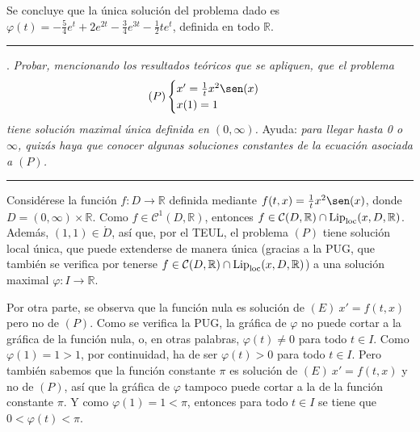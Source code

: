 \documentclass[11pt]{report}
\newcommand{\R}{\mathbb R}
\begin{document}
Se concluye que la única solución del problema dado es $\varphi(t)=-\frac{5}{4}e^t+2e^{2t}-\frac{3}{4}e^{3t}-\frac{1}{2}te^t$, definida en todo $\R$.

\vspace{4mm}

\hrule

\vspace{4mm}

. \textit{Probar, mencionando los resultados teóricos que se apliquen, que el problema}
\[(P) \begin{cases}
    x'=\frac{1}{t}x^2\sen(x) \\
    x(1)=1
\end{cases}\]
\textit{tiene solución maximal única definida en $(0,\infty)$.} Ayuda: \textit{para llegar hasta 0 o $\infty$, quizás haya que conocer algunas soluciones constantes de la ecuación asociada a $(P)$.}

\vspace{4mm}

\hrule

\vspace{4mm}

Considérese la función $f \colon D \to \R$ definida mediante $f(t,x)=\frac{1}{t}x^2\sen(x)$, donde $D=(0,\infty) \times \R$. Como $f \in \mathcal{C}^1(D,\R)$, entonces $f \in \mathcal{C}(D,\R) \cap\textup{Lip}_{\textup{loc}}(x,D,\R)$. Además, $(1,1) \in \mathring{D}$, así que, por el TEUL, el problema $(P)$ tiene solución local única, que puede extenderse de manera única (gracias a la PUG, que también se verifica por tenerse $f \in \mathcal{C}(D,\R) \cap\textup{Lip}_{\textup{loc}}(x,D,\R)$) a una solución maximal $\varphi \colon I \to \R$.

\vspace{2mm}

Por otra parte, se observa que la función nula es solución de $(E) \ x'=f(t,x)$ pero no de $(P)$. Como se verifica la PUG, la gráfica de $\varphi$ no puede cortar a la gráfica de la función nula, o, en otras palabras, $\varphi(t) \neq 0$ para todo $t \in I$. Como $\varphi(1)=1>1$, por continuidad, ha de ser $\varphi(t)>0$ para todo $t \in I$. Pero también sabemos que la función constante $\pi$ es solución de $(E) \ x'=f(t,x)$ y no de $(P)$, así que la gráfica de $\varphi$ tampoco puede cortar a la de la función constante $\pi$. Y como $\varphi(1)=1 <\pi$, entonces para todo $t \in I$ se tiene que $0<\varphi(t)<\pi$.

\vspace{2mm}
\end{document}
